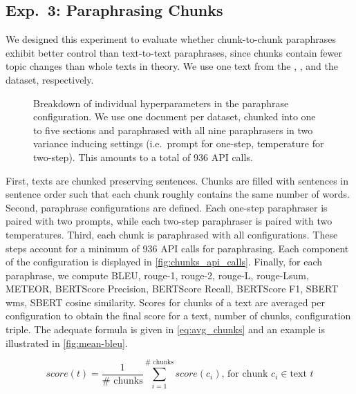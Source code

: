 \subsection{Exp.\ 3: Paraphrasing Chunks}
\label{subsec:paraphrasing_chunks}

We designed this experiment to evaluate whether chunk-to-chunk paraphrases exhibit better control than text-to-text paraphrases, since chunks contain fewer topic changes than whole texts in theory.
We use one text from the \dataBlog{}, \dataGutenberg{}, and the \dataStudent{} dataset, respectively.


\begin{figure}[htbp]
  \centering
  
  \caption[Paraphrase configuration hyperparameters.]{Breakdown of individual hyperparameters in the paraphrase configuration.
  We use one document per dataset, chunked into one to five sections and paraphrased with all nine paraphrasers in two variance inducing settings (i.e.\ prompt for one-step, temperature for two-step).
  This amounts to a total of 936 API calls. 
  }
  \label{fig:chunks_api_calls}
\end{figure}


First, texts are chunked preserving sentences.
Chunks are filled with sentences in sentence order such that each chunk roughly contains the same number of words.
Second, paraphrase configurations are defined.
Each one-step paraphraser is paired with two prompts, while each two-step paraphraser is paired with two temperatures.
Third, each chunk is paraphrased with all configurations.
These steps account for a minimum of 936 API calls for paraphrasing.
Each component of the configuration is displayed in \autoref{fig:chunks_api_calls}.
Finally, for each paraphrase, we compute BLEU, \ac{rouge}-1, \ac{rouge}-2, \ac{rouge}-L, \ac{rouge}-Lsum, METEOR, BERT\-Score Precision, BERT\-Score Recall, BERT\-Score F1, SBERT \ac{wms}, SBERT cosine similarity.
Scores for chunks of a text are averaged per configuration to obtain the final score for a text, number of chunks, configuration triple.
The adequate formula is given in \autoref{eq:avg_chunks} and an example is illustrated in \autoref{fig:mean-bleu}.

\begin{equation}
    score(t) = \frac{1}{\#\text{ chunks}}\sum_{i=1}^{\#\text{ chunks}}score(c_i)\text{, for chunk }c_i \in \text{text }t
\label{eq:avg_chunks}
\end{equation}

